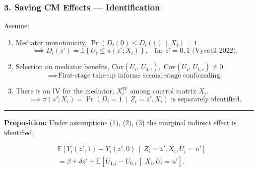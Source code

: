 \documentclass[dvipsnames]{beamer} %
\renewcommand{\vec}[1]{\boldsymbol{\mathit{#1}}}                           %
\newcommand{\Probgiven}[2]{\Pr\left( #1 \, \middle\vert \, #2 \right)} %
\newcommand{\Egiven}[3][]{\mathbb{E}_{#1} \left[ #2 \, \middle\vert \, #3 \right]} %
\newcommand{\Cov}[1]{\text{Cov} \left( #1 \right)}                         %
\newcommand{\indicator}[1]{\mathds{1}\left\{ #1 \right\}}                  %
\begin{document}
\begin{frame}
    \frametitle{3. Saving CM Effects --- Identification}
    Assume:
    \begin{enumerate}
        \item Mediator monotonicity,
        $\Probgiven{ D_i(0) \leq D_i(1) }{\vec X_i} = 1$
        \[ \implies D_i(z') = \indicator{U_i \leq \pi(z'; \vec X_i)},
            \;\;\; \text{for } z'=0,1 \text{  (Vycatil 2022)}. \]
        \item Selection on mediator benefits,
        $\Cov{U_i, \, U_{0,i}}, \; \Cov{U_i, \, U_{1,i}} \neq 0$
        \[ \implies \text{First-stage take-up informs second-stage confounding.} \]
        \item There is an IV for the mediator, $\vec X_i^{\text{IV}}$ among control matrix $\vec X_i$.
        \[ \implies \pi(z'; \vec X_i) = \Probgiven{D_i = 1}{Z_i =z',\vec X_i} 
        \text{ is separately identified.} \]
    \end{enumerate}
    \par\noindent\rule{\textwidth}{0.4pt}
    \textbf{Proposition:}
    Under assumptions (1), (2), (3) the marginal indirect effect is identified,

    \vskip-0.75cm
    \begin{align*}
        & \Egiven{Y_i(z', 1) - Y_i(z', 0)}{Z_i = z', \vec X_i, U_i = u'} \\
        &= \beta + \delta z' + \Egiven{U_{1,i} - U_{0,i}}{\vec X_i, U_i = u'}.
    \end{align*}
\end{frame}
\end{document}
